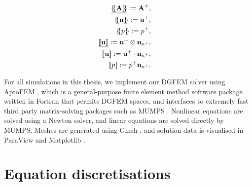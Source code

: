         \begin{align*}
            \begin{split}
                \averagevec{\mat{A}} & := \mat{A}^+,
            \end{split}\\
            \begin{split}
                \average{\vec{u}} & := \vec{u}^+,
            \end{split}\\
            \begin{split}
                \average{p} & := p^+,
            \end{split}\\
            \begin{split}
                \jumpvec{\vec{u}} & := \vec{u}^+ \otimes \vec{n}_{\kappa^+},
            \end{split}\\
            \begin{split}
                \jump{\vec{u}} & := \vec{u}^+ \cdot \vec{n}_{\kappa^+},
            \end{split}\\
            \begin{split}
                \jump{p} & := p^+ \vec{n}_{\kappa^+}.
            \end{split}
        \end{align*}
    
        For all simulations in this thesis, we implement our DGFEM solver using AptoFEM \cite{houstonAptoFEMUserManual2024}, which is a general-purpose finite element method software package written in Fortran that permits DGFEM spaces, and interfaces to extremely fast third party matrix-solving packages such as MUMPS \cite{amestoyFullyAsynchronousMultifrontal2001}. Nonlinear equations are solved using a Newton solver, and linear equations are solved directly by MUMPS. Meshes are generated using Gmsh \cite{geuzaineGmshFiniteElement2009}, and solution data is visualised in ParaView \cite{ayachitParaViewGuideUpdated2015} and Matplotlib \cite{hunterMatplotlib2DGraphics2007}.

    \section{Equation discretisations} \label{sec:numerical-methods:equation-discretisations}    
    
